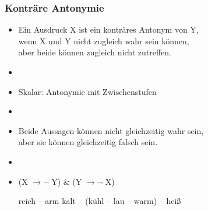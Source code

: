
\begin{frame}
\frametitle{Konträre Antonymie}

\begin{itemize}
	\item
Ein Ausdruck X ist ein konträres Antonym von Y,\\
wenn X und Y nicht zugleich wahr sein können,\\
aber beide können zugleich nicht zutreffen.
	\item[]
	\item Skalar: Antonymie mit Zwischenstufen
	\item[]
	\item Beide Aussagen können nicht gleichzeitig wahr sein,\\
              aber sie können gleichzeitig falsch sein.
	\item[]
	\item (X $\rightarrow \lnot$ Y) \& (Y $\rightarrow \lnot$ X)
	
	\eal
		\ex reich -- arm
		\ex kalt -- (kühl -- lau -- warm) -- heiß
	\zl
	
\end{itemize}

\end{frame}











